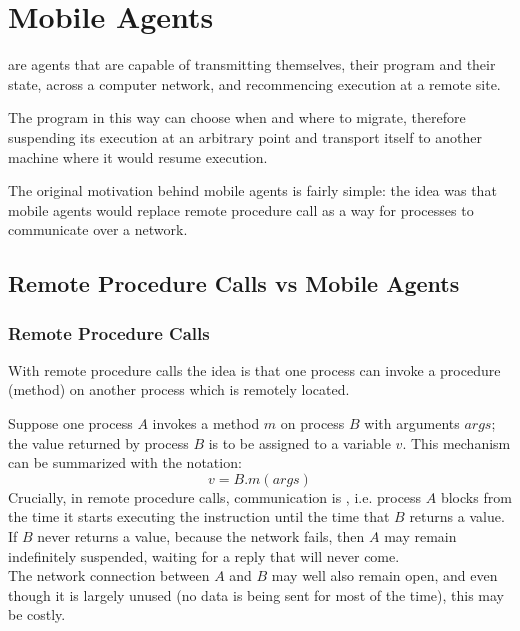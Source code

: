 

\chapter{Mobile Agents}
\minitoc

\phantom{c} are agents that are capable of transmitting themselves, their program and their state, across a computer network, and recommencing execution at a remote site.

The program in this way can choose when and where to migrate, therefore suspending its execution at an arbitrary point and transport itself to another machine where it would resume execution.

The original motivation behind mobile agents is fairly simple: the idea was that mobile agents would replace remote procedure call as a way for processes to communicate over a network.\\



\section{Remote Procedure Calls vs Mobile Agents}
\subsection{Remote Procedure Calls}

With remote procedure calls the idea is that one process can invoke a procedure (method) on another process which is remotely located.

Suppose one process $A$ invokes a method $m$ on process $B$ with arguments $args$; the value returned by process $B$ is to be assigned to a variable $v$. This mechanism can be summarized with the notation:
\[v = B.m(args)\]
Crucially, in remote procedure calls, communication is , i.e. process $A$ blocks from the time it starts executing the instruction until the time that $B$ returns a value. If $B$ never returns a value, because the network fails, then $A$ may remain indefinitely suspended, waiting for a reply that will never come.\\
The network connection between $A$ and $B$ may well also remain open, and even though it is largely unused (no data is being sent for most of the time), this may be costly.

